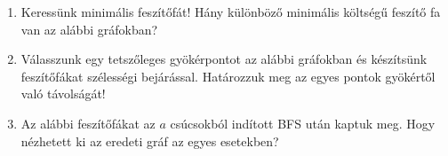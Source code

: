 \documentclass[a4paper,12pt]{article}
\begin{document}
    \noindent{}
    \noindent{}
    \begin{enumerate}
        \item Keressünk minimális feszítőfát! Hány különböző minimális költségű feszítő fa van az alábbi gráfokban?
        \begin{figure}[!h]
            \centering
            \hfill
             \hfill
             \hfill
             \hfill
        \end{figure}

        \item Válasszunk egy tetszőleges gyökérpontot az alábbi gráfokban és készítsünk feszítőfákat szélességi bejárással. Határozzuk meg az egyes pontok gyökértől való távolságát!
        \begin{figure}[h]
            \centering
             \hspace{1in}
            
        \end{figure}

        \item Az alábbi feszítőfákat az $a$ csúcsokból indított BFS után kaptuk meg. Hogy nézhetett ki az eredeti gráf az egyes esetekben? 
        \begin{figure}[!h]
            \centering
            \begin{subfigure}{0.2\textwidth}
                \centering
                
            \end{subfigure}
            \begin{subfigure}{0.2\textwidth}
                \centering		
                
            \end{subfigure}
            \begin{subfigure}{0.2\textwidth}
                \centering
                
            \end{subfigure}
            \begin{subfigure}{0.2\textwidth}
                \centering
                
            \end{subfigure}
        \end{figure}


\end{enumerate}
\end{document}
